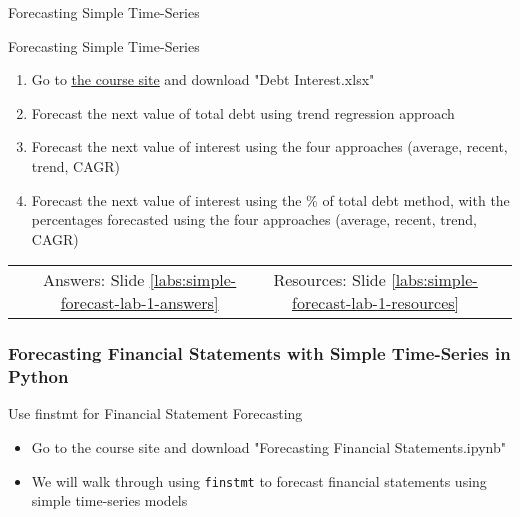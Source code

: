\documentclass[handout, 11pt]{beamer}
\begin{document}
\begin{section}{Forecasting Simple Time-Series}
\begin{frame}
{\begin{block}{Forecasting Simple Time-Series}
\begin{enumerate}
\item Go to
\textcolor{blue}{\underline{\href{https://nickderobertis.github.io/fin-model-course/}{the course site}}}
and download "Debt Interest.xlsx"
\item Forecast the next value of total debt using trend regression approach
\item Forecast the next value of interest using the four approaches (average, recent, trend, CAGR)
\item Forecast the next value of interest using the \% of total debt method, with the percentages forecasted using the four approaches (average, recent, trend, CAGR)
\end{enumerate}
\vfill
\begin{tabular*}{\textwidth}{@{\extracolsep{\fill}}cccc}
\toprule
\hfill & Answers: Slide \textcolor{blue}{\underline{\ref{labs:simple-forecast-lab-1-answers}}} & Resources: Slide \textcolor{blue}{\underline{\ref{labs:simple-forecast-lab-1-resources}}} & \hfill\\

\end{tabular*}
\end{block}
}
\label{labs:simple-forecast-lab-1}
\end{frame}
\begin{frame}
\frametitle{Forecasting Financial Statements with Simple Time-Series in Python}
{
\begin{block}{Use finstmt for Financial Statement Forecasting}
\begin{itemize}
\item Go to the course site and download "Forecasting Financial Statements.ipynb"
\item We will walk through using \texttt{finstmt} to forecast financial statements using simple time-series models
\end{itemize}
\end{block}
}
\end{frame}
\end{section}
\end{document}
